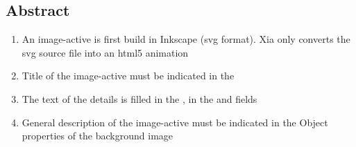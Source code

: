 

\subsection{Abstract}

\begin{enumerate}
 \item An image-active is first build in Inkscape (svg format). Xia only 
 converts the svg source file into an html5 animation
 \item Title of the image-active must be indicated in the 
 \item The text of the details is filled in the , 
 in the  and  fields
 \item General description of the image-active must be indicated in the \chemin
{Object properties} of the background image
\end{enumerate}

